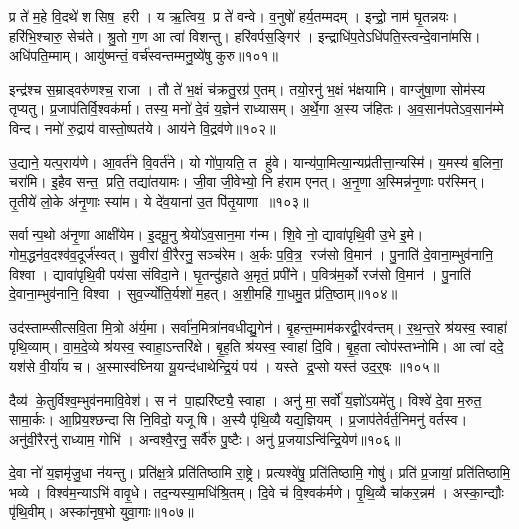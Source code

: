 प्र ते॑ म॒हे वि॒दथे॑ शसिष॒ हरी।
य ऋ॒त्विय॒ प्र ते॑ वन्वे।
व॒नुषो॑ हर्य॒तम्मदम्।
इन्द्रो॒ नाम॑ घृ॒तन्नयः।
हरि॑भि॒श्चारु॒ सेच॑ते।
श्रु॒तो ग॒ण आ त्वा॑ विशन्तु।
हरि॑वर्पस॒ङ्गिर॑।
इन्द्राधि॑प॒तेऽधि॑पति॒स्त्वन्दे॒वाना॑मसि।
अधि॑पति॒म्माम्।
आयु॑ष्मन्तं॒ वर्च॑स्वन्तम्मनु॒ष्ये॑षु कुरु॥१०१॥

इन्द्र॑श्च स॒म्राड्वरु॑णश्च॒ राजा।
तौ ते॑ भ॒क्षं च॑क्रतु॒रग्र॑ ए॒तम्।
तयो॒रनु॑ भ॒क्षं भ॑क्षयामि।
वाग्जु॑षा॒णा सोम॑स्य तृप्यतु।
प्र॒जाप॑तिर्वि॒श्वक॑र्मा।
तस्य॒ मनो॑ दे॒वं य॒ज्ञेन॑ राध्यासम्।
अ॒र्थे॒गा अ॒स्य ज॑हितः।
अ॒व॒सान॑पतेऽव॒सान॑म्मे विन्द।
नमो॑ रु॒द्राय॑ वास्तो॒ष्पत॑ये।
आय॑ने वि॒द्रव॑णे॥१०२॥

उ॒द्याने॒ यत्प॒राय॑णे।
आ॒वर्त॑ने वि॒वर्त॑ने।
यो गो॑पा॒यति॒ त हु॑वे।
यान्य॑पा॒मित्या॒न्यप्र॑तीत्ता॒न्यस्मि॑।
य॒मस्य॑ ब॒लिना॒ चरा॑मि।
इ॒हैव सन्त॒ प्रति॒ तद्या॑तयामः।
जी॒वा जी॒वेभ्यो॒ नि ह॑राम एनत्।
अ॒नृ॒णा अ॒स्मिन्न॑नृ॒णाः पर॑स्मिन्।
तृ॒तीये॑ लो॒के अ॑नृ॒णाः स्या॑म।
ये दे॑व॒याना॑ उ॒त पि॑तृ॒याणा॥१०३॥

सर्वान्प॒थो अ॑नृ॒णा आक्षी॑येम।
इ॒दमू॒नु श्रेयो॑ऽव॒सान॒मा ग॑न्म।
शि॒वे नो॒ द्यावा॑पृथि॒वी उ॒भे इ॒मे।
गोम॒द्धन॑व॒दश्व॑व॒दूर्ज॑स्वत्।
सु॒वीरा॑ वी॒रैरनु॒ सञ्च॑रेम।
अ॒र्कः प॒वि॒त्र॒ रज॑सो वि॒मान॑।
पु॒नाति॑ दे॒वाना॒म्भुव॑नानि॒ विश्वा।
द्यावा॑पृथि॒वी पय॑सा संविदा॒ने।
घृ॒तन्दु॑हाते अ॒मृतं॒ प्रपी॑ने।
प॒वित्र॑म॒र्को रज॑सो वि॒मान॑।
पु॒नाति॑ दे॒वाना॒म्भुव॑नानि॒ विश्वा।
सुव॒र्ज्योति॒र्यशो॑ म॒हत्।
अ॒शी॒महि॑ गा॒धमु॒त प्र॑ति॒ष्ठाम्॥१०४॥\anuvakamend[चा॒त॒य॒त॒ श्री॒णी॒ता॒ स॒त्यमा॒हुर॑शीमहि ग॒णे कु॑रु वि॒द्रव॑णे पितृ॒याणा॑ अ॒र्को रज॑सो वि॒मान॒स्त्रीणि॑ च]

उद॑स्ताम्प्सीत्सवि॒ता मि॒त्रो अ॑र्य॒मा।
सर्वा॑न॒मित्रा॑नवधीद्यु॒गेन॑।
बृ॒हन्त॒म्माम॑करद्वी॒रव॑न्तम्।
र॒थ॒न्त॒रे श्र॑यस्व॒ स्वाहा॑ पृथि॒व्याम्।
वा॒म॒दे॒व्ये श्र॑यस्व॒ स्वाहा॒ऽन्तरि॑क्षे।
बृ॒ह॒ति श्र॑यस्व॒ स्वाहा॑ दि॒वि।
बृ॒ह॒ता त्वोप॑स्तभ्नोमि।
आ त्वा॑ ददे॒ यश॑से वी॒र्या॑य च।
अ॒स्मास्व॑घ्निया यू॒यन्द॑धाथेन्द्रि॒यं पय॑।
यस्ते द्र॒प्सो यस्त॑ उद॒र्॒षः ॥१०५॥

दैव्य॑ के॒तुर्विश्व॒म्भुव॑नमावि॒वेश॑।
स न॑ पा॒ह्यरि॑ष्ट्यै॒ स्वाहा।
अनु॑ मा॒ सर्वो॑ य॒ज्ञो॑ऽयमे॑तु।
विश्वे॑ दे॒वा म॒रुत॒ सामा॒र्कः।
आ॒प्रिय॒श्छन्दासि नि॒विदो॒ यजूषि।
अ॒स्यै पृ॑थि॒व्यै यद्य॒ज्ञियम्।
प्र॒जाप॑तेर्वर्त॒निमनु॑ वर्तस्व।
अनु॑वी॒रैरनु॑ राध्याम॒ गोभि॑।
अन्वश्वै॒रनु॒ सर्वै॑रु पु॒ष्टैः।
अनु॑ प्र॒जयाऽन्वि॑न्द्रि॒येण॑॥१०६॥

दे॒वा नो॑ य॒ज्ञमृ॑जु॒धा न॑यन्तु।
प्रति॑क्ष॒त्रे प्रति॑तिष्ठामि रा॒ष्ट्रे।
प्रत्यश्वे॑षु॒ प्रति॑तिष्ठामि॒ गोषु॑।
प्रति॑ प्र॒जायां॒ प्रति॑तिष्ठामि॒ भव्ये।
विश्व॑म॒न्याऽभि॑ वावृ॒धे।
तद॒न्यस्या॒मधि॑श्रि॒तम्।
दि॒वे च॑ वि॒श्वक॑र्मणे।
पृ॒थि॒व्यै चा॑कर॒न्नम॑।
अस्का॒न्द्यौः पृ॑थि॒वीम्।
अस्का॑नृष॒भो युवा॒गाः॥१०७॥

